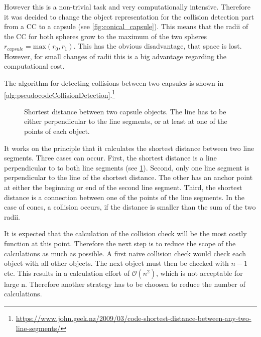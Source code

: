% 
However this is a non-trivial task and very computationally intensive.
Therefore it was decided to change the object representation for the collision detection part from a \ac{CC} to a capsule (see \cref{fig:conical_capsule}).
This means that the radii of the \ac{CC} for both spheres grow to the maximum of the two spheres $r_{\mathit{capsule}} = \mathrm{max}(r_0, r_1)$.
This has the obvious disadvantage, that space is lost. However, for small changes of radii this is a big advantage regarding the computational cost.
\par
%  
The algorithm for detecting collisions between two capsules is shown in \cref{alg:pseudocodeCollisionDetection}.\footnote{\href{https://www.john.geek.nz/2009/03/code-shortest-distance-between-any-two-line-segments/}{https://www.john.geek.nz/2009/03/code-shortest-distance-between-any-two-line-segments/}}
% 
\begin{figure}[!t]
    \centering
    \def\tikzheight{0.5\textwidth}
	\caption[Shortest distance of capsule objects]{Shortest distance between two capsule objects. The line has to be either perpendicular to the line segments, or at least at one of the points of each object.}
	\label{fig:shortDist}
\end{figure}
% 
It works on the principle that it calculates the shortest distance between two line segments.
Three cases can occur.
First, the shortest distance is a line perpendicular to to both line segments (see \cref{fig:shortDist}).
Second, only one line segment is perpendicular to the line of the shortest distance.
The other has an anchor point at either the beginning or end of the second line segment.
Third, the shortest distance is a connection between one of the points of the line segments.
In the case of cones, a collision occurs, if the distance is smaller than the sum of the two radii.
\par
%  
It is expected that the calculation of the collision check will be the most costly function at this point.
Therefore the next step is to reduce the scope of the calculations as much as possible.
A first naive collision check would check each object with all other objects.
The next object must then be checked with $n-1$ etc.
This results in a calculation effort of $\mathcal{O}(n^{2})$, which is not acceptable for large n.
Therefore another strategy has to be choosen to reduce the number of calculations.
% 
